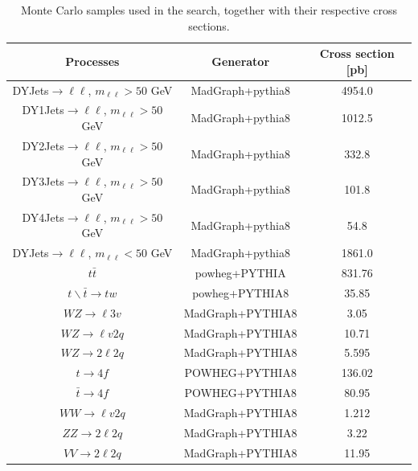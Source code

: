 \begin{table}[!hbpt]
\caption{Monte Carlo samples used in the search, together with their respective cross sections.}
\begin{center}
\begin{tabular}{|c|c|c|}
\hline
Processes & Generator & Cross section [pb] \\\hline
DYJets$\to\ell \ell$, $m_{\ell \ell}>50$ GeV &MadGraph+pythia8   & 4954.0 \\\hline
DY1Jets$\to\ell \ell$, $m_{\ell \ell}>50$ GeV &MadGraph+pythia8 & 1012.5 \\\hline
DY2Jets$\to\ell \ell$, $m_{\ell \ell}>50$ GeV&MadGraph+pythia8  & 332.8 \\\hline
DY3Jets$\to\ell \ell$, $m_{\ell \ell}>50$ GeV&MadGraph+pythia8  & 101.8 \\\hline
DY4Jets$\to\ell \ell$, $m_{\ell \ell}>50$ GeV&MadGraph+pythia8  & 54.8 \\\hline
DYJets$\to\ell \ell$, $m_{\ell \ell}<50$ GeV&MadGraph+pythia8    & 1861.0 \\\hline
$t\bar{t}$                                                     & powheg+PYTHIA     &  831.76\\\hline
$t \backslash \bar{t}\to t w$                        & powheg+PYTHIA8     &  35.85 \\\hline
$WZ \to \ell 3v$                                          & MadGraph+PYTHIA8   &  3.05   \\\hline
$WZ \to \ell v 2q $                                      & MadGraph+PYTHIA8   &  10.71  \\\hline
$WZ \to 2 \ell 2q $                                      &  MadGraph+PYTHIA8  &  5.595 \\\hline
$t\to4f $                                                     & POWHEG+PYTHIA8       & 136.02\\\hline
$\bar{t}\to4f $                                             & POWHEG+PYTHIA8       & 80.95\\\hline
$WW \to \ell v 2q$                                      & MadGraph+PYTHIA8   &  1.212   \\\hline
$ZZ \to 2\ell 2q $                                        & MadGraph+PYTHIA8    &  3.22   \\\hline
$VV \to2\ell 2 q$                                        &  MadGraph+PYTHIA8   &  11.95  \\\hline

\end{tabular}
\end{center}
\label{tab:mutaumcsamples}
\end{table}

